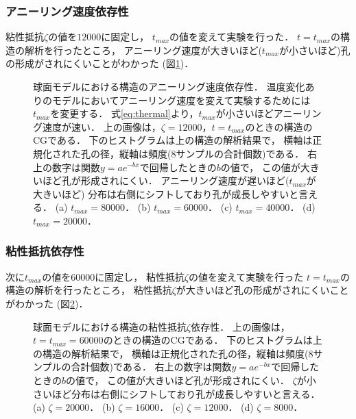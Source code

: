 \subsubsection{アニーリング速度依存性}
粘性抵抗$\zeta$の値を$12000$に固定し，
$t_{max}$の値を変えて実験を行った．
$t=t_{max}$の構造の解析を行ったところ，
アニーリング速度が大きいほど($t_{max}$が小さいほど)孔の形成がされにくいことがわかった
(図\ref{fig:result_sphere_anearing_speed_comb})．
\begin{figure}
    \centering
    
    \caption{
        球面モデルにおける構造のアニーリング速度依存性．
        温度変化ありのモデルにおいてアニーリング速度を変えて実験するためには$t_{max}$を変更する．
        式\ref{eq:thermal}より，$t_{max}$が小さいほどアニーリング速度が速い．
        上の画像は，$\zeta=12000$，$t=t_{max}$のときの構造のCGである．
        下のヒストグラムは上の構造の解析結果で，
        横軸は正規化された孔の径，縦軸は頻度(8サンプルの合計個数)である．
        右上の数字は関数$y=ae^{-bx}$で回帰したときの$b$の値で，
        この値が大きいほど孔が形成されにくい．
        アニーリング速度が遅いほど($t_{max}$が大きいほど)
        分布は右側にシフトしており孔が成長しやすいと言える．
        (a) $t_{max}=80000$．
        (b) $t_{max}=60000$．
        (c) $t_{max}=40000$．
        (d) $t_{max}=20000$．
    }
    \label{fig:result_sphere_anearing_speed_comb}
\end{figure}


\subsubsection{粘性抵抗依存性}
次に$t_{max}$の値を$60000$に固定し，
粘性抵抗$\zeta$の値を変えて実験を行った
$t=t_{max}$の構造の解析を行ったところ，
粘性抵抗$\zeta$が大きいほど孔の形成がされにくいことがわかった
(図\ref{fig:result_sphere_friction_constant_comb})．
\begin{figure}
    \centering
    
    \caption{
        球面モデルにおける構造の粘性抵抗$\zeta$依存性．
        上の画像は，$t=t_{max}=60000$のときの構造のCGである．
        下のヒストグラムは上の構造の解析結果で，
        横軸は正規化された孔の径，縦軸は頻度(8サンプルの合計個数)である．
        右上の数字は関数$y=ae^{-bx}$で回帰したときの$b$の値で，
        この値が大きいほど孔が形成されにくい．
        $\zeta$が小さいほど分布は右側にシフトしており孔が成長しやすいと言える．
        (a) $\zeta=20000$．
        (b) $\zeta=16000$．
        (c) $\zeta=12000$．
        (d) $\zeta=8000$．
    }
    \label{fig:result_sphere_friction_constant_comb}
\end{figure}


